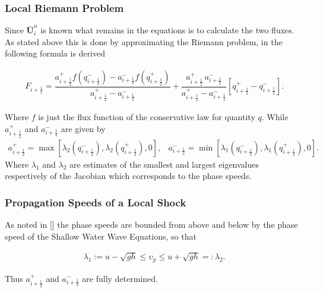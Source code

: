 \documentclass[SingleSpace,12pt]{Serre_ASCE}
\begin{document}
\subsubsection{Local Riemann Problem} %
Since $\boldsymbol{\bar{U}}^{n}_i$ is known what remains in the equations is to calculate the two fluxes. As stated above this is done by approximating the Riemann problem, in \cite{Kurganov-etal-2001-707} the following formula is derived
\begin{linenomath*}
\begin{gather}\label{eq:HLL_flux}
F_{i+\frac{1}{2}} = \dfrac{a^+_{i+\frac{1}{2}} f\left(q^-_{i+\frac{1}{2}}\right) - a^-_{i+\frac{1}{2}} f\left(q^+_{i+\frac{1}{2}}\right)}{a^+_{i+\frac{1}{2}} - a^-_{i+\frac{1}{2}}}  + \dfrac{a^+_{i+\frac{1}{2}} \, a^-_{i+\frac{1}{2}}}{a^+_{i+\frac{1}{2}} - a^-_{i+\frac{1}{2}}} \left [ q^+_{i+\frac{1}{2}} - q^-_{i+\frac{1}{2}} \right ].
\end{gather}
\end{linenomath*}
Where $f$ is just the flux function of the conservative law for quantity $q$.
While $a^+_{i+\frac{1}{2}}$ and $a^-_{i+\frac{1}{2}}$ are given by
\begin{subequations}
\begin{gather}
a^+_{i+\frac{1}{2}} = \max \left[\lambda_2\left(q^-_{i + \frac{1}{2}}\right), \lambda_2\left(q^+_{i + \frac{1}{2}}\right), 0 \right],
\label{eq:aatcelledgem}
\end{gather}
\begin{gather}
a^-_{i+\frac{1}{2}} = \min \left[\lambda_1\left(q^-_{i + \frac{1}{2}}\right), \lambda_1\left(q^+_{i + \frac{1}{2}}\right), 0 \right].
\label{eq:aatcelledgep}
\end{gather}
\end{subequations}
Where $\lambda_1$ and $\lambda_2$ are estimates of the smallest and largest eigenvalues respectively of the Jacobian which corresponds to the phase speeds.
\subsubsection{Propagation Speeds of a Local Shock} %
As noted in \cite{Hank-etal-2010-2034} [] the phase speeds are bounded from above and below by the phase speed of the Shallow Water Wave Equations, so that
\begin{linenomath*}
\begin{gather}
 \lambda_1 := u - \sqrt{gh} \le \upsilon_p \le u + \sqrt{gh} =: \lambda_2.
\end{gather}
\end{linenomath*}
Thus $a^+_{i+\frac{1}{2}}$ and $a^-_{i+\frac{1}{2}}$ are fully determined.
\end{document}
